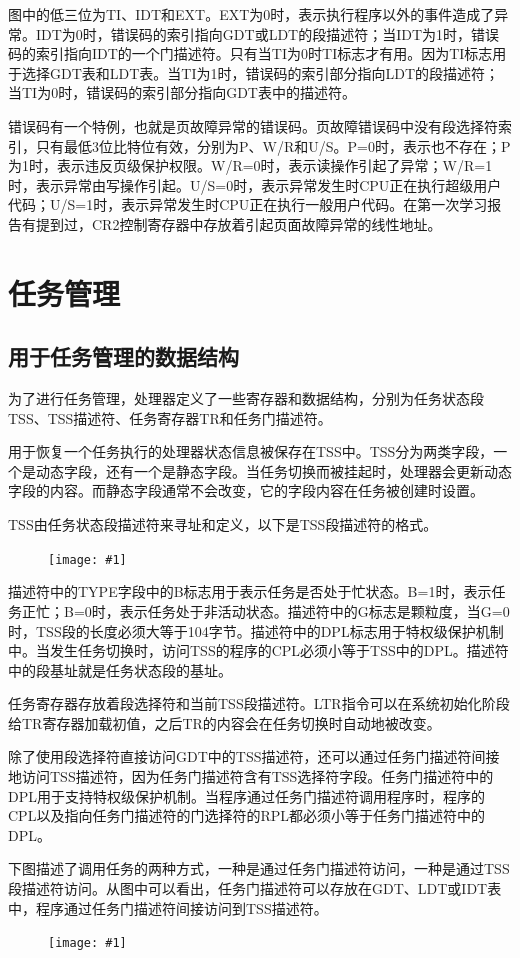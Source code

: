 \documentclass[a4paper,left=2.5cm,right=2.5cm,11pt]{article}
\newcommand{\fic}[1]{\begin{figure}[H]
		\center
		\texttt{[image: \#1]}
	\end{figure}}
\begin{document}
	图中的低三位为TI、IDT和EXT。EXT为0时，表示执行程序以外的事件造成了异常。IDT为0时，错误码的索引指向GDT或LDT的段描述符；当IDT为1时，错误码的索引指向IDT的一个门描述符。只有当TI为0时TI标志才有用。因为TI标志用于选择GDT表和LDT表。当TI为1时，错误码的索引部分指向LDT的段描述符；当TI为0时，错误码的索引部分指向GDT表中的描述符。\par
	错误码有一个特例，也就是页故障异常的错误码。页故障错误码中没有段选择符索引，只有最低3位比特位有效，分别为P、W/R和U/S。P=0时，表示也不存在；P为1时，表示违反页级保护权限。W/R=0时，表示读操作引起了异常；W/R=1时，表示异常由写操作引起。U/S=0时，表示异常发生时CPU正在执行超级用户代码；U/S=1时，表示异常发生时CPU正在执行一般用户代码。在第一次学习报告有提到过，CR2控制寄存器中存放着引起页面故障异常的线性地址。\par

\section{任务管理}
\subsection{用于任务管理的数据结构}
	为了进行任务管理，处理器定义了一些寄存器和数据结构，分别为任务状态段TSS、TSS描述符、任务寄存器TR和任务门描述符。\par
	用于恢复一个任务执行的处理器状态信息被保存在TSS中。TSS分为两类字段，一个是动态字段，还有一个是静态字段。当任务切换而被挂起时，处理器会更新动态字段的内容。而静态字段通常不会改变，它的字段内容在任务被创建时设置。\par
	TSS由任务状态段描述符来寻址和定义，以下是TSS段描述符的格式。
	\fic{5.png}
	
	描述符中的TYPE字段中的B标志用于表示任务是否处于忙状态。B=1时，表示任务正忙；B=0时，表示任务处于非活动状态。描述符中的G标志是颗粒度，当G=0时，TSS段的长度必须大等于104字节。描述符中的DPL标志用于特权级保护机制中。当发生任务切换时，访问TSS的程序的CPL必须小等于TSS中的DPL。描述符中的段基址就是任务状态段的基址。\par
	任务寄存器存放着段选择符和当前TSS段描述符。LTR指令可以在系统初始化阶段给TR寄存器加载初值，之后TR的内容会在任务切换时自动地被改变。\par
	除了使用段选择符直接访问GDT中的TSS描述符，还可以通过任务门描述符间接地访问TSS描述符，因为任务门描述符含有TSS选择符字段。任务门描述符中的DPL用于支持特权级保护机制。当程序通过任务门描述符调用程序时，程序的CPL以及指向任务门描述符的门选择符的RPL都必须小等于任务门描述符中的DPL。\par
	下图描述了调用任务的两种方式，一种是通过任务门描述符访问，一种是通过TSS段描述符访问。从图中可以看出，任务门描述符可以存放在GDT、LDT或IDT表中，程序通过任务门描述符间接访问到TSS描述符。
	\fic{6.png}
\end{document}
